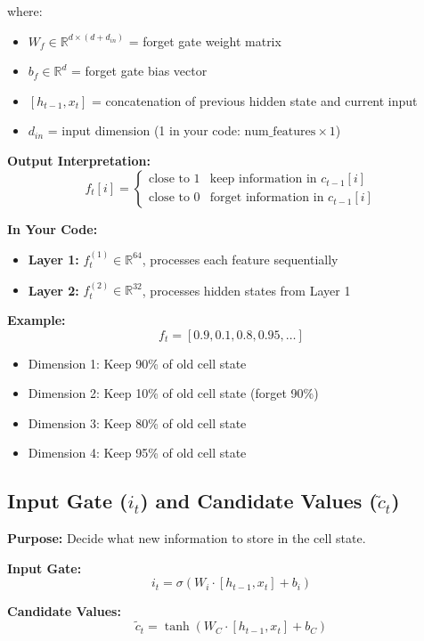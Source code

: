 \documentclass[12pt]{article}
\begin{document}
where:
\begin{itemize}
    \item $W_f \in \mathbb{R}^{d \times (d + d_{in})}$ = forget gate weight matrix
    \item $b_f \in \mathbb{R}^d$ = forget gate bias vector
    \item $[h_{t-1}, x_t]$ = concatenation of previous hidden state and current input
    \item $d_{in}$ = input dimension (1 in your code: $\text{num\_features} \times 1$)
\end{itemize}

\textbf{Output Interpretation:}
\[
f_t[i] = \begin{cases}
\text{close to 1} & \text{keep information in } c_{t-1}[i] \\
\text{close to 0} & \text{forget information in } c_{t-1}[i]
\end{cases}
\]

\textbf{In Your Code:}
\begin{itemize}
    \item \textbf{Layer 1:} $f_t^{(1)} \in \mathbb{R}^{64}$, processes each feature sequentially
    \item \textbf{Layer 2:} $f_t^{(2)} \in \mathbb{R}^{32}$, processes hidden states from Layer 1
\end{itemize}

\textbf{Example:}
\[
f_t = [0.9, 0.1, 0.8, 0.95, \ldots]
\]
\begin{itemize}
    \item Dimension 1: Keep 90\% of old cell state
    \item Dimension 2: Keep 10\% of old cell state (forget 90\%)
    \item Dimension 3: Keep 80\% of old cell state
    \item Dimension 4: Keep 95\% of old cell state
\end{itemize}

\subsection{Input Gate ($i_t$) and Candidate Values ($\tilde{c}_t$)}

\textbf{Purpose:} Decide what new information to store in the cell state.

\textbf{Input Gate:}
\[
i_t = \sigma(W_i \cdot [h_{t-1}, x_t] + b_i)
\]

\textbf{Candidate Values:}
\[
\tilde{c}_t = \tanh(W_C \cdot [h_{t-1}, x_t] + b_C)
\]
\end{document}
